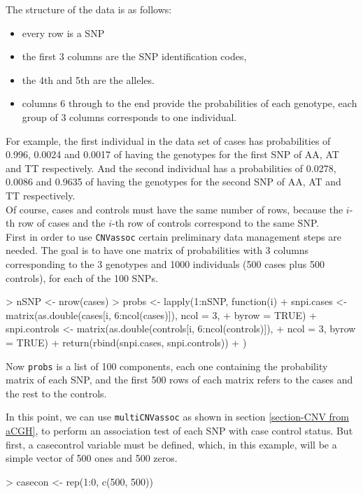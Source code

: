 \documentclass[11pt]{article}
\begin{document}
\normalsize
The structure of the data is as follows:
\begin{itemize}
\item every row is a SNP
\item the first 3 columns are the SNP identification codes,
\item the 4th and 5th are the alleles.
\item columns 6 through to the end provide the probabilities of each genotype, each group of 3 columns corresponds to one individual.

\end{itemize}

For example, the first individual in the data set of cases has probabilities of 0.996, 0.0024 and
0.0017 of having the genotypes for the first SNP of AA,
AT and TT respectively.
And the second individual has a probabilities of 0.0278, 0.0086 and
0.9635 of having the genotypes for the second SNP of AA,
AT and TT respectively.\\

Of course, cases and controls must have the same number of rows, because the $i$-th row of cases and the $i$-th row of controls correspond
to the same SNP.\\

First in order to use \texttt{CNVassoc} certain preliminary data management steps are needed.
The goal is to have one matrix of probabilities with 3 columns corresponding to the 3 genotypes and 1000 individuals (500 cases plus 500 controls),
for each of the 100 SNPs.

\begin{Schunk}
\begin{Sinput}
> nSNP <- nrow(cases)
> probs <- lapply(1:nSNP, function(i) {
+   snpi.cases <- matrix(as.double(cases[i, 6:ncol(cases)]), ncol = 3,
+ byrow = TRUE)
+   snpi.controls <- matrix(as.double(controls[i, 6:ncol(controls)]),
+ ncol = 3, byrow = TRUE)
+   return(rbind(snpi.cases, snpi.controls))
+ })
\end{Sinput}
\end{Schunk}

Now \texttt{probs} is a list of 100 components, each one containing the probability matrix of each SNP, and the first 500 rows of each matrix
refers to the cases and the rest to the controls.

In this point, we can use \texttt{multiCNVassoc} as shown in section \ref{section-CNV from aCGH}, to perform an association
test of each SNP with case control status.
But first, a casecontrol variable must be defined, which, in this example, will be a simple vector of 500 ones and 500 zeros.
\begin{Schunk}
\begin{Sinput}
> casecon <- rep(1:0, c(500, 500))
\end{Sinput}
\end{Schunk}
\end{document}
